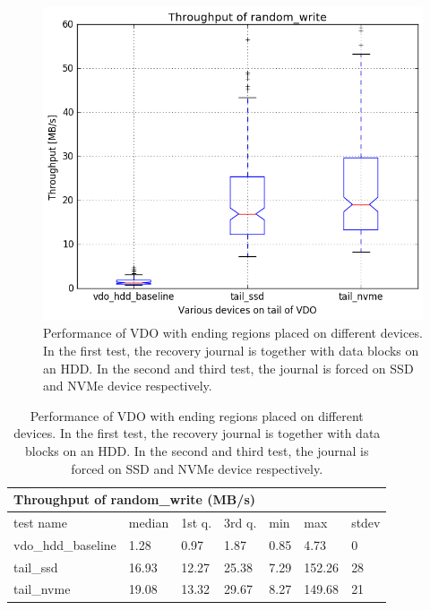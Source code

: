 \documentclass[
  color, %
  table, %
  lof,   %
  lot,   %
]{fithesis3}
\begin{document}
\begin{figure}[!htb]
        \centering
        \includegraphics[width=\textwidth]{../results/journal/report/random_write1_compare_boxplots}
\caption[Performance of VDO with ending regions placed on different devices.]{Performance of VDO with ending regions placed on different devices. In the first test, the recovery journal is together with data blocks on an HDD. In the second and third test, the journal is forced on SSD and NVMe device respectively.}
\label{fig:journal-all}
\end{figure}

\begin{table}[!htb]
\centering
\begin{tabular}{|l|l|l|l|l|l|l|}
        \hline
        \multicolumn{7}{|l|}{Throughput of random\_write (MB/s)} \\ \hline
        test name & median & 1st q. & 3rd q. & min & max & stdev \\ \hline 
vdo\_hdd\_baseline & 1.28 & 0.97 & 1.87 & 0.85 & 4.73 & 0 \\ \hline
tail\_ssd & 16.93 & 12.27 & 25.38 & 7.29 & 152.26 & 28 \\ \hline
tail\_nvme & 19.08 & 13.32 & 29.67 & 8.27 & 149.68 & 21 \\ \hline
\end{tabular}
\caption[Performance of VDO with ending regions placed on different devices.]{Performance of VDO with ending regions placed on different devices. In the first test, the recovery journal is together with data blocks on an HDD. In the second and third test, the journal is forced on SSD and NVMe device respectively.}
\label{tab:journal}
\end{table}
\end{document}
